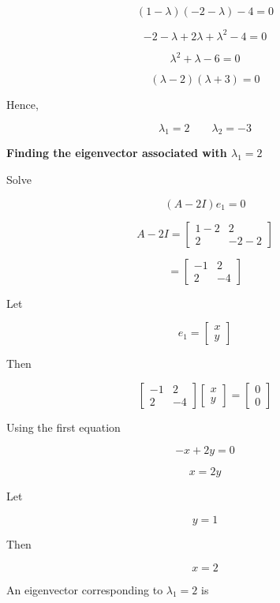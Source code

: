 \documentclass[12pt]{article}
\begin{document}
\[
(1-\lambda)(-2-\lambda)-4=0
\]

\[
-2-\lambda+2\lambda+\lambda^2-4=0
\]

\[
\lambda^2+\lambda-6=0
\]

\[
(\lambda-2)(\lambda+3)=0
\]

\noindent
Hence,

\[
\boxed{
\lambda_1=2
\qquad
\lambda_2=-3
}
\]

\vspace{0.7cm}

\noindent
\textbf{Finding the eigenvector associated with \(\lambda_1=2\)}

\vspace{0.3cm}

\noindent
Solve

\[
(A-2I)e_1=0
\]

\[
A-2I
=
\begin{bmatrix}
1-2 & 2\\
2 & -2-2
\end{bmatrix}
\]

\[
=
\begin{bmatrix}
-1 & 2\\
2 & -4
\end{bmatrix}
\]

\noindent
Let

\[
e_1=
\begin{bmatrix}
x\\
y
\end{bmatrix}
\]

\noindent
Then

\[
\begin{bmatrix}
-1 & 2\\
2 & -4
\end{bmatrix}
\begin{bmatrix}
x\\
y
\end{bmatrix}
=
\begin{bmatrix}
0\\
0
\end{bmatrix}
\]

\noindent
Using the first equation

\[
-x+2y=0
\]

\[
x=2y
\]

\noindent
Let

\[
y=1
\]

\noindent
Then

\[
x=2
\]

\noindent
An eigenvector corresponding to \(\lambda_1=2\) is
\end{document}

